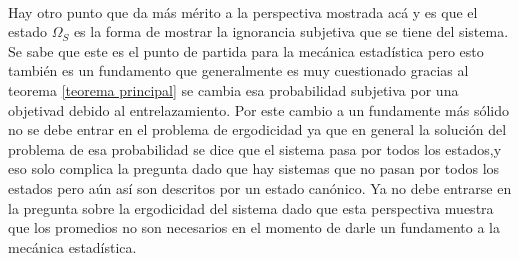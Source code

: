 \\
Hay otro punto que da más mérito a la perspectiva mostrada acá y es que el estado $\Omega_{S}$ es la forma de mostrar la ignorancia subjetiva que se tiene del sistema. Se sabe que este es el punto de partida para la mecánica estadística pero esto también es un fundamento que generalmente es muy cuestionado gracias al teorema \ref{teorema principal} se cambia esa probabilidad subjetiva por una objetivad debido al entrelazamiento. Por este cambio a un fundamente más sólido no se debe entrar en el problema de ergodicidad ya que en general la solución del problema de esa probabilidad se dice que el sistema pasa por todos los estados,y eso solo complica la pregunta dado que hay sistemas que no pasan por todos los estados pero aún así son descritos por un estado canónico. Ya no debe entrarse en la pregunta sobre la ergodicidad del sistema dado que esta perspectiva muestra que los promedios no son necesarios en el momento de darle un fundamento a la mecánica estadística.




